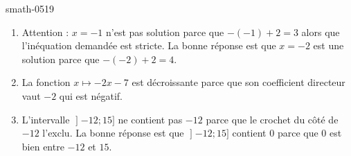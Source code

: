 
\begin{corrige}{smath-0519}

    \begin{enumerate}
        \item
            Attention : \( x=-1\) n'est pas solution parce que \( -(-1)+2=3\) alors que l'inéquation demandée est stricte. La bonne réponse est que \( x=-2\) est une solution parce que \( -(-2)+2=4\).
        \item
            La fonction \( x\mapsto -2x-7\) est décroissante parce que son coefficient directeur vaut \( -2\) qui est négatif.
        \item
            L'intervalle \( \mathopen] -12 ; 15 \mathclose]\) ne contient pas \( -12\) parce que le crochet du côté de \( -12\) l'exclu. La bonne réponse est que \( \mathopen] -12 ; 15 \mathclose]\) contient \( 0\) parce que \( 0\) est bien entre \( -12\) et \( 15\).
    \end{enumerate}

\end{corrige}
